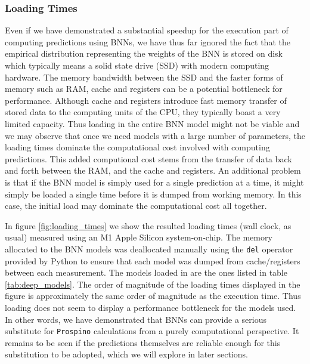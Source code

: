 \subsubsection{Loading Times}
Even if we have demonstrated a substantial speedup for the execution part of computing predictions using BNNs, we have thus far ignored the fact that the empirical distribution representing the weights of the BNN is stored on disk which typically means a solid state drive (SSD) with modern computing hardware. The memory bandwidth between the SSD and the faster forms of memory such as RAM, cache and registers can be a potential bottleneck for performance. Although cache and registers introduce fast memory transfer of stored data to the computing units of the CPU, they typically boast a very limited capacity. Thus loading in the entire BNN model might not be viable and we may observe that once we need models with a large number of parameters, the loading times dominate the computational cost involved with computing predictions. This added computional cost stems from the transfer of data back and forth between the RAM, and the cache and registers. An additional problem is that if the BNN model is simply used for a single prediction at a time, it might simply be loaded a single time before it is dumped from working memory. In this case, the initial load may dominate the computational cost all together. 

In figure \ref{fig:loading_times} we show the resulted loading times (wall clock, as usual) measured using an M1 Apple Silicon system-on-chip. The memory allocated to the BNN models was deallocated manually using the {\tt del} operator provided by Python to ensure that each model was dumped from cache/registers between each measurement. The models loaded in are the ones listed in table \ref{tab:deep_models}. The order of magnitude of the loading times displayed in the figure is approximately the same order of magnitude as the execution time. Thus loading does not seem to display a performance bottleneck for the models used. In other words, we have demonstrated that BNNs can provide a serious substitute for {\tt Prospino} calculations from a purely computational perspective. It remains to be seen if the predictions themselves are reliable enough for this substitution to be adopted, which we will explore in later sections.

